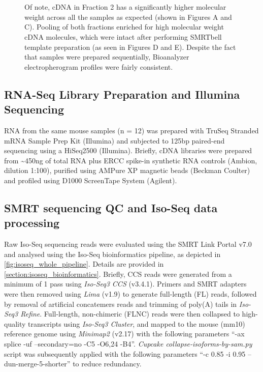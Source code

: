 \begin{figure}[!htp]
{	\\
	\\	 	
	Of note, cDNA in Fraction 2 has a significantly higher molecular weight across all the samples as expected (shown in Figures A and C). Pooling of both fractions enriched for high molecular weight cDNA molecules, which were intact after performing SMRTbell template preparation (as seen in Figures D and E). Despite the fact that samples were prepared sequentially, Bioanalyzer electropherogram profiles were fairly consistent. 
	}
	\label{fig:isoseq_whole_bioresults}
\end{figure}

\clearpage
\subsection{RNA-Seq Library Preparation and Illumina Sequencing}
RNA from the same mouse samples (n = 12) was prepared with TruSeq Stranded mRNA Sample Prep Kit (Illumina) and subjected to 125bp paired-end sequencing using a HiSeq2500 (Illumina)\cite{Castanho2020}. Briefly, cDNA libraries were prepared from \textasciitilde450ng of total RNA plus ERCC spike-in synthetic RNA controls (Ambion, dilution 1:100), purified using AMPure XP magnetic beads (Beckman Coulter) and profiled using D1000 ScreenTape System (Agilent). 

\subsection{SMRT sequencing QC and Iso-Seq data processing}\label{ch4_methods: isoseq_data}
Raw Iso-Seq sequencing reads were evaluated using the SMRT Link Portal v7.0 and analysed using the Iso-Seq bioinformatics pipeline, as depicted in \cref{fig:isoseq_whole_pipeline}. Details are provided in \cref{section:isoseq_bioinformatics}. Briefly, CCS reads were generated from a minimum of 1 pass using \textit{Iso-Seq3 CCS} (v3.4.1). Primers and SMRT adapters were then removed using \textit{Lima} (v1.9) to generate full-length (FL) reads, followed by removal of artificial concatemers reads and trimming of poly(A) tails in \textit{Iso-Seq3 Refine}. Full-length, non-chimeric (FLNC) reads were then collapsed to high-quality transcripts using \textit{Iso-Seq3 Cluster}, and mapped to the mouse (mm10) reference genome using \textit{Minimap2} (v2.17) with the following parameters “-ax splice -uf --secondary=no -C5 -O6,24 -B4”. \textit{ Cupcake collapse-isoforms-by-sam.py} script was subsequently applied with the following parameters  “-c 0.85 -i 0.95 --dun-merge-5-shorter” to reduce redundancy. 


